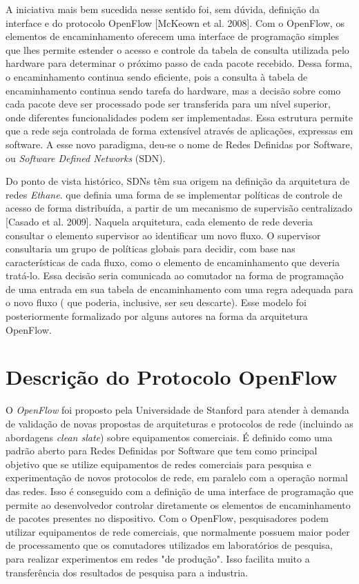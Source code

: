 A iniciativa mais bem sucedida nesse sentido foi, sem dúvida,
definição da interface e do protocolo OpenFlow [McKeown et al.
2008]. Com o OpenFlow, os elementos de encaminhamento 
oferecem uma interface de programação simples que lhes
permite estender o acesso e controle da tabela de consulta 
utilizada pelo hardware para determinar o próximo passo de 
cada pacote recebido. Dessa forma, o encaminhamento continua 
sendo eficiente, pois a consulta à tabela de encaminhamento 
continua sendo tarefa do hardware, mas a decisão sobre 
como cada pacote deve ser processado pode ser transferida
para um nível superior, onde diferentes funcionalidades 
podem ser implementadas. Essa estrutura permite que a rede
seja controlada de forma extensível através de aplicações,
expressas em software. A esse novo paradigma, deu-se o 
nome de Redes Definidas por Software, ou \textit{Software
Defined Networks} (SDN).

Do ponto de vista histórico, SDNs têm sua origem na definição
da arquitetura de redes \textit{Ethane}. que definia uma forma
de se implementar políticas de controle de acesso de forma 
distribuída, a partir de um mecanismo de supervisão centralizado
[Casado et al. 2009]. Naquela arquitetura, cada elemento de 
rede deveria consultar o elemento supervisor ao identificar um
novo fluxo. O supervisor consultaria um grupo de políticas 
globais para decidir, com base nas características de cada
fluxo, como o elemento de encaminhamento que deveria 
tratá-lo. Essa decisão seria comunicada ao comutador na 
forma de programação de uma entrada em sua tabela de
encaminhamento com uma regra adequada para o novo fluxo (
que poderia, inclusive, ser seu descarte). Esse modelo foi
posteriormente formalizado por alguns autores na forma da 
arquitetura OpenFlow.

\section{Descrição do Protocolo OpenFlow}

O \textit{OpenFlow} foi proposto pela Universidade de
Stanford para atender à demanda de validação de novas
propostas de arquiteturas e protocolos de rede (incluindo as
abordagens \textit{clean slate}) sobre equipamentos
comerciais. É definido como uma padrão aberto para Redes
Definidas por Software que tem como principal objetivo que 
se utilize equipamentos de redes comerciais para pesquisa e 
experimentação de novos protocolos de rede, em paralelo
com a operação normal das redes. Isso é conseguido com a 
definição de uma interface de programação que permite 
ao desenvolvedor controlar diretamente os elementos de 
encaminhamento de pacotes presentes no dispositivo. Com o 
OpenFlow, pesquisadores podem utilizar equipamentos de 
rede comerciais, que normalmente possuem maior poder 
de processamento que os comutadores utilizados em 
laboratórios de pesquisa, para realizar experimentos em redes
"de produção". Isso facilita muito a transferência dos resultados
de pesquisa para a industria. 

